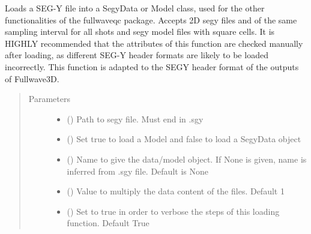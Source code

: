 \documentclass[letterpaper,10pt,english]{sphinxmanual}
\begin{document}

\begin{fulllineitems}
\label{\detokenize{index:fullwaveqc.tools.load}}
Loads a SEG-Y file into a SegyData or Model class, used for the other functionalities of the fullwaveqc package.
Accepts 2D segy files and of the same sampling interval for all shots and segy model files with square cells.
It is HIGHLY recommended that the attributes of this function are checked manually after loading, as different
SEG-Y header formats are likely to be loaded incorrectly. This function is adapted to the SEGY header format of
the outputs of Fullwave3D.
\begin{quote}\begin{description}
\item[{Parameters}] \leavevmode\begin{itemize}
\item {} 
 () \textendash{} Path to segy file. Must end in .sgy

\item {} 
 () \textendash{} Set true to load a Model and false to load a SegyData object

\item {} 
 (\sphinxstyleliteralemphasis{\sphinxupquote{, }}) \textendash{} Name to give the data/model object. If None is given, name is inferred from .sgy file. Default is None

\item {} 
 (\sphinxstyleliteralemphasis{\sphinxupquote{, }}) \textendash{} Value to multiply the data content of the files. Default 1

\item {} 
 (\sphinxstyleliteralemphasis{\sphinxupquote{, }}) \textendash{} Set to true in order to verbose the steps of this loading function. Default True


\end{itemize}
\end{description}
\end{quote}
\end{fulllineitems}
\end{document}
